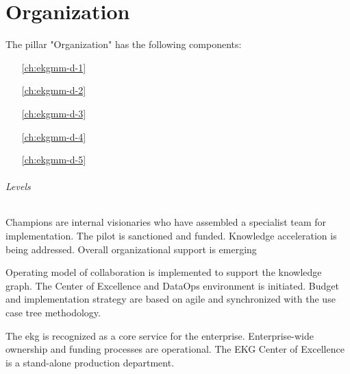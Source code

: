 \part{Organization}\label{pt:ekgmm-d} %

The pillar "Organization" has the following components:

\begin{itemize}[leftmargin=.5in]
    \item [\ref{ch:ekgmm-d-1}] 
    \item [\ref{ch:ekgmm-d-2}] 
    \item [\ref{ch:ekgmm-d-3}] 
    \item [\ref{ch:ekgmm-d-4}] 
    \item [\ref{ch:ekgmm-d-5}] 
\end{itemize}

\paragraph{Levels}

\begin{description}[nosep,font=\bfseries]

    \item [1. \glsfmtshort{ekg} Initiation, \glsfmtshort{mvp}]
    Champions are internal visionaries who have assembled a specialist team for implementation.
    The pilot is sanctioned and funded.
    Knowledge acceleration is being addressed.
    Overall organizational support is emerging

    \item [2. Extensible Platform (reusable components)]
    Operating model of collaboration is implemented to support the knowledge graph.
    The Center of Excellence and DataOps environment is initiated.
    Budget and implementation strategy are based on agile and synchronized with the
    use case tree methodology.

    \item [3. Enterprise Ready]
    The \gls{ekg} is recognized as a core service for the enterprise.
    Enterprise-wide ownership and funding processes are operational.
    The EKG Center of Excellence is a stand-alone production department.

\end{description}





